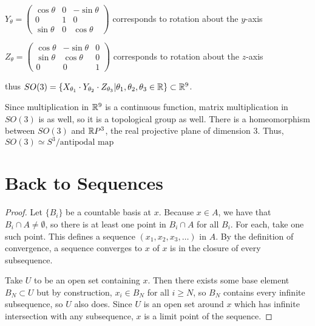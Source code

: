 $Y_\theta = 
\begin{pmatrix} 
\cos\theta & 0 & -\sin\theta \\
0 & 1 & 0 \\
\sin\theta & 0 &  \cos\theta
\end{pmatrix}
$ corresponds to rotation about the $y$-axis


$Z_\theta = 
\begin{pmatrix} 
\cos\theta  & -\sin\theta & 0 \\
\sin\theta &  \cos\theta & 0\\
0 & 0 & 1
\end{pmatrix}
$ corresponds to rotation about the $z$-axis

thus $SO(3) = \left\{  X_{\theta_1}\cdot Y_{\theta_2}\cdot Z_{\theta_3} | \theta_1,\theta_2,\theta_3\in \mathbb{R}  \right\}\subset \mathbb{R}^9$.

Since multiplication in $\mathbb{R}^9$ is a continuous function, matrix multiplication in $SO(3)$ is as well, so it is a topological group as well.  There is a homeomorphism between $SO(3)$ and $\mathbb{R} P^3$, the real projective plane of dimension $3$.  Thus, $SO(3)\simeq S^3/{\text{antipodal map}}$

\section*{Back to Sequences}


\begin{proof}
	
	
	Let $\{B_i\}$ be a countable basis at $x$.  Because $x\in A$, we have that $B_i\cap A\neq \emptyset$, so there is at least one point in $B_i\cap A$ for all $B_i$.  For each, take one such point.  This defines a sequence $(x_1,x_2,x_3,\dots)$ in $A$.  By the definition of convergence, a sequence converges to $x$ of $x$ is in the closure of every subsequence.
	
    Take $U$ to be an open set containing $x$.  Then there exists some base element $B_N \subset U$ but by construction, $x_i\in B_N$ for all $i\geq N$, so $B_N$ contains every infinite subsequence, so $U$ also does.  Since $U$ is an open set around $x$ which has infinite intersection with any subsequence, $x$ is a limit point of the sequence.
	
	
	
\end{proof}

